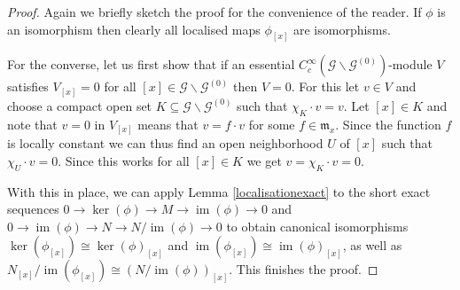 \documentclass{amsart}
\newcommand{\G}{\mathcal{G}}
\newcommand{\ccinfty}{C_c^\infty}
\DeclareMathOperator{\im}{im}
\begin{document}
\begin{proof} 
Again we briefly sketch the proof for the convenience of the reader. 
If $ \phi $ is an isomorphism then clearly all localised maps $ \phi_{[x]} $ are isomorphisms. 

For the converse, let us first show that if an essential $ \ccinfty(\G \backslash \G^{(0)}) $-module $ V $ satisfies $ V_{[x]} = 0 $ for all $ [x] \in \G \backslash \G^{(0)} $ then $ V = 0 $. 
For this let $ v \in V $ and choose a compact open set $ K \subseteq \G \backslash \G^{(0)} $ such that $ \chi_K \cdot v = v $. Let $ [x] \in K $ and note that $ v = 0 $ in $ V_{[x]} $ means that $ v = f \cdot v $ for some $ f \in \mathfrak{m}_x $. Since the function $ f $ is locally constant we can thus find an open neighborhood $ U $ of $ [x] $ such that $ \chi_U \cdot v = 0 $. Since this works for all $ [x] \in K $ we get $ v = \chi_K \cdot v = 0 $. 

With this in place, we can apply Lemma \ref{localisationexact} to the short exact sequences $ 0 \rightarrow \ker(\phi) \rightarrow M \rightarrow \im(\phi) \rightarrow 0 $ and $ 0 \rightarrow \im(\phi) \rightarrow N \rightarrow N/\im(\phi) \rightarrow 0 $ to obtain canonical isomorphisms $ \ker(\phi_{[x]}) \cong \ker(\phi)_{[x]} $ and $ \im(\phi_{[x]}) \cong \im(\phi)_{[x]} $, as well as  $ N_{[x]}/\im(\phi_{[x]}) \cong (N/\im(\phi))_{[x]} $. This finishes the proof. 
\end{proof}
\end{document}
